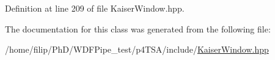 Definition at line 209 of file Kaiser\+Window.\+hpp.



The documentation for this class was generated from the following file\+:\begin{DoxyCompactItemize}
\item 
/home/filip/\+Ph\+D/\+W\+D\+F\+Pipe\+\_\+test/p4\+T\+S\+A/include/\hyperlink{_kaiser_window_8hpp}{Kaiser\+Window.\+hpp}\end{DoxyCompactItemize}
